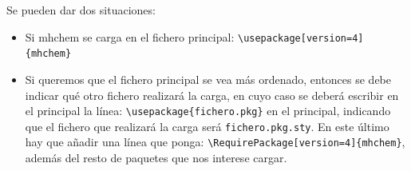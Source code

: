 Se pueden dar dos situaciones:
\vspace{-1ex}
\begin{itemize}
\item Si \textsf{mhchem} se carga en el fichero principal:
  \textcolor{red!70!black}{\texttt{\textbackslash usepackage[version=4]\{mhchem\}}}
\item Si queremos que el fichero principal se vea más ordenado, entonces se debe
  indicar qué otro fichero realizará la carga, en cuyo caso se deberá escribir en
  el principal la línea: 
  \textcolor{red!70!black}{\texttt{\textbackslash usepackage\{fichero.pkg\}}} en el
  principal, indicando que el fichero que realizará la carga será 
 \texttt{fichero.pkg.sty}. En este último hay que añadir una línea que ponga:
 \textcolor{red!70!black}{\texttt{\textbackslash RequirePackage[version=4]\{mhchem\}}},
 además del resto de paquetes que nos interese cargar.
\end{itemize}

